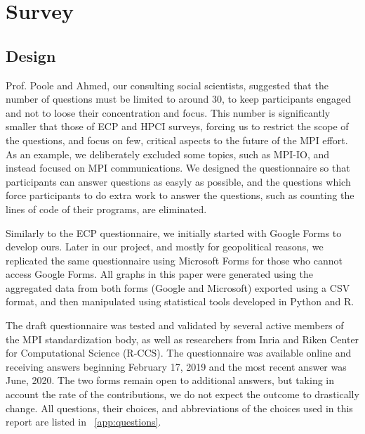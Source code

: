 \documentclass[preprint,5p,times]{elsarticle}
\newcommand{\revision}[2]{{\color{blue}#2}}
\begin{document}
\section{Survey}

\subsection*{Design}
%
\revision{The social scientists}{Prof. Poole and Ahmed, our consulting social
scientists,} suggested that the number of questions must be
limited \revision{}{to}
around 30, to keep participants engaged and not to loose their concentration and
focus. This number is significantly smaller that those of ECP and HPCI surveys,
forcing us to restrict the scope of the questions, and focus on few, critical
aspects to the future of the MPI effort. As an example, we deliberately excluded
some topics, such as MPI-IO, and instead focused on MPI communications.
We designed the questionnaire so that participants can answer questions
as easyly as possible, and the questions which force participants to do
extra work to answer the questions, such as counting the lines of
code of their programs, are eliminated.

Similarly to the ECP questionnaire, we initially started with Google Forms to
develop ours. Later in our project, and mostly for geopolitical reasons, we
replicated the same questionnaire using Microsoft Forms for those who cannot
access Google Forms. All graphs in this paper were generated using the
aggregated data from both forms (Google and Microsoft) exported using a CSV
format, and then manipulated using statistical tools developed in Python and R.

The draft questionnaire was tested and validated by several active members of
the MPI standardization body, as well as researchers from Inria and Riken Center
for Computational Science (R-CCS).
\revision{}{
The questionnaire was available online and receiving answers beginning February
17, 2019 and the most recent answer was June, 2020. The two forms remain open to additional
answers, but taking in account the rate of the contributions, we do not expect
the outcome to drastically change.}
All questions, their choices, and abbreviations of the choices used in
this report are listed in ~\ref{app:questions}.
\end{document}
